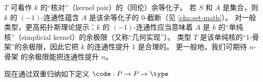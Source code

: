 \begin{rmk}
  $T$ 可看作 $k$ 的“核对”（kernel pair）的（同伦）余等化子。
  若 $S$ 和 $A$ 是集合，则 $k$ 的 $(-1)$-连通性蕴含 $A$ 是该余等化子的 $0$-截断（见 \cref{cha:set-math}）。
  对一般类型，更高拓扑斯理论提示：$k$ 的 $(-1)$-连通性应当意味着 $A$ 是 $k$ 的“单纯核”（simplicial kernel）的余极限（又称“几何实现”）。
  类型 $T$ 是该单纯核的“1-骨架”的余极限，因此它把 $k$ 的连通性提升 1 是合理的。
  更一般地，我们可期待 $n$-骨架 的余极限能把连通性提升 $n$。
\end{rmk}

%

现在通过双重归纳如下定义 $\code:P\to P\to \type$
